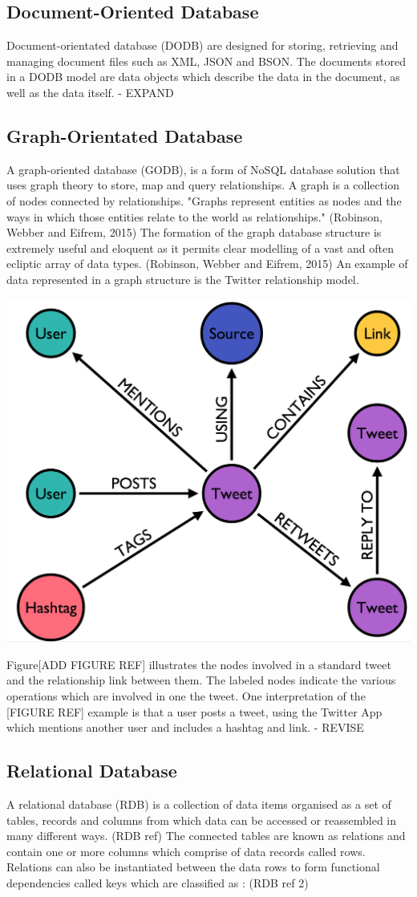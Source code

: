\subsection{Document-Oriented Database}
Document-orientated database (DODB) are designed for storing, retrieving and managing document files such as XML, JSON and BSON. The documents stored in a DODB model are data objects which describe the data in the document, as well as the data itself. - EXPAND

\subsection{Graph-Orientated Database}
A graph-oriented database (GODB), is a form of NoSQL database solution that uses graph theory to store, map and query relationships. A graph is a collection of nodes connected by relationships. "Graphs represent entities as nodes and the ways in which those entities relate to the world as relationships." (Robinson, Webber and Eifrem, 2015) The formation of the graph database structure is extremely useful and eloquent as it permits clear modelling of a vast and often ecliptic array of data types. (Robinson, Webber and Eifrem, 2015) An example of data represented in a graph structure is the Twitter relationship model. \begin{center}\includegraphics[width=0.3\linewidth]{images/graphdb_twitter}\end{center}  Figure[ADD FIGURE REF] illustrates the nodes involved in a standard tweet and the relationship link between them. The labeled nodes indicate the various operations which are involved in one the tweet. One interpretation of the [FIGURE REF] example is that a user posts a tweet, using the Twitter App which mentions another user and includes a hashtag and link. - REVISE

\subsection{Relational Database}
A relational database (RDB) is a collection of data items organised as a set of tables, records and columns from which data can be accessed or reassembled in many different ways. (RDB ref) The connected tables are known as relations and contain one or more columns which comprise of data records called rows. Relations can also be instantiated between the data rows to form functional dependencies called keys which are classified as : (RDB ref 2)

